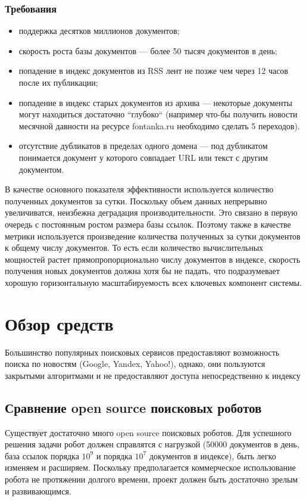 \subsection{Требования}
\begin{itemize}
 \item поддержка десятков миллионов документов;
 \item скорость роста базы документов --- более 50 тысяч документов в день;
 \item попадение в индекс документов из RSS лент не позже чем через 12 часов после их публикации;
 \item попадение в индекс старых документов из архива --- некоторые документы могут находиться достаточно ``глубоко`` (например что-бы получить новости месячной давности на ресурсе fontanka.ru необходимо сделать 5 переходов).
 \item отсутствие дубликатов в пределах одного домена --- под дубликатом понимается документ у которого совпадает URL или текст с другим документом.
\end{itemize}

В качестве основного показателя эффективности используется количество полученных документов за сутки.
 Поскольку объем данных непрерывно увеличиватся, неизбежна деградация производительности. Это связано в первую очередь с постоянным ростом размера базы ссылок.
 Поэтому также в качестве метрики используется произведение количества полученных за сутки документов к общему числу документов. То есть если количество вычислительных мощностей растет прямопропорционально числу документов в индексе, скорость получения новых документов должна хотя бы не падать, что подразумевает хорошую горизонтальную масштабируемость всех ключевых компонент системы.



\chapter{Обзор средств}
Большинство популярных поисковых сервисов предоставляют возможность поиска по новостям (Google, Yandex, Yahoo!), однако, они пользуются закрытыми алгоритмами и не предоставляют доступа непосредственно к индексу
\section{Сравнение open source поисковых роботов}
Существует достаточно много open source поисковых роботов. Для успешного решения задачи робот должен справлятся с нагрузкой (50000 документов в день, база ссылок порядка $10^{9}$ и порядка $10^7$ документов в индексе), быть легко изменяем и расширяем. Поскольку предполагается коммерческое использование робота не протяжении долгого времени, проект должен быть достаточно зрелым и развивающимся.

